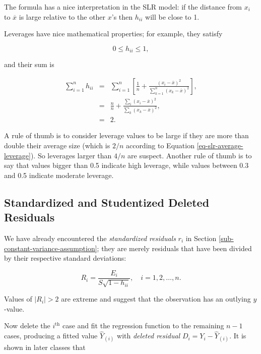 \documentclass[]{book}
\numberwithin{equation}{chapter}
\numberwithin{figure}{chapter}
\theoremstyle{plain}
\theoremstyle{definition}
\theoremstyle{remark}
\theoremstyle{definition}
\theoremstyle{definition}
\theoremstyle{remark}
\begin{document}
The formula has a nice interpretation in the SLR model: if the distance
from \(x_{i}\) to \(\overline{x}\) is large relative to the other
\(x\)'s then \(h_{ii}\) will be close to 1.

Leverages have nice mathematical properties; for example, they satisfy

\begin{equation}
\label{eq-slr-leverage-between}
0\leq h_{ii}\leq1,
\end{equation}

and their sum is

\begin{eqnarray}
\label{eq-slr-average-leverage}
\sum_{i=1}^{n}h_{ii} & = & \sum_{i=1}^{n}\left[\frac{1}{n}+\frac{(x_{i}-\overline{x})^{2}}{\sum_{k=1}^{n}(x_{k}-\overline{x})^{2}}\right],\\
 & = & \frac{n}{n}+\frac{\sum_{i}(x_{i}-\overline{x})^{2}}{\sum_{k}(x_{k}-\overline{x})^{2}},\\
 & = & 2.
\end{eqnarray}

A rule of thumb is to consider leverage values to be large if they are
more than double their average size (which is \(2/n\) according to
Equation \eqref{eq-slr-average-leverage}). So leverages larger than
\(4/n\) are suspect. Another rule of thumb is to say that values bigger
than 0.5 indicate high leverage, while values between 0.3 and 0.5
indicate moderate leverage.

\subsection{Standardized and Studentized Deleted
Residuals}\label{standardized-and-studentized-deleted-residuals}

We have already encountered the \emph{standardized residuals} \(r_{i}\)
in Section \ref{sub-constant-variance-assumption}; they are merely
residuals that have been divided by their respective standard
deviations:

\begin{equation}
R_{i}=\frac{E_{i}}{S\sqrt{1-h_{ii}}},\quad i=1,2,\ldots,n.
\end{equation}

Values of \(|R_{i}| > 2\) are extreme and suggest that the observation
has an outlying \(y\)-value.

Now delete the \(i^{\mathrm{th}}\) case and fit the regression function
to the remaining \(n - 1\) cases, producing a fitted value
\(\hat{Y}_{(i)}\) with \emph{deleted residual}
\(D_{i}=Y_{i}-\hat{Y}_{(i)}\). It is shown in later classes that
\end{document}
